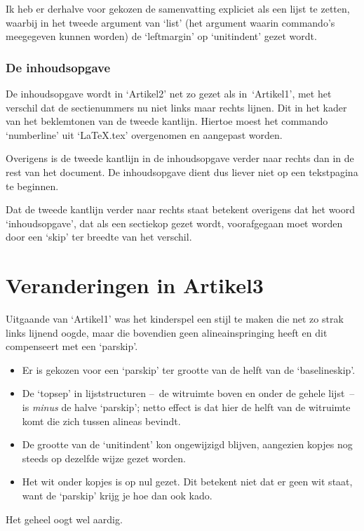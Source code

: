 \documentclass[a4paper]{artikel1} %
\begin{document}
Ik heb er derhalve voor gekozen de samenvatting expliciet als een
lijst te zetten, waarbij in het tweede argument van `list' (het
argument waarin commando's meegegeven kunnen worden) de `leftmargin'
op `unitindent' gezet wordt.
 
\section{De inhoudsopgave}
 
De inhoudsopgave wordt in `Artikel2' net zo gezet als in~`Artikel1',
met het verschil dat de sectienummers nu niet links maar rechts
lijnen. Dit in het kader van het beklemtonen van de tweede kantlijn.
Hiertoe moest het commando `numberline' uit `LaTeX.tex' overgenomen en
aangepast worden.
 
Overigens is de tweede kantlijn in de inhoudsopgave verder naar rechts
dan in de rest van het document. De inhoudsopgave dient dus liever
niet op een tekstpagina te beginnen.
 
Dat de tweede kantlijn verder naar rechts staat betekent overigens dat
het woord `inhoudsopgave', dat als een sectiekop gezet wordt,
voorafgegaan moet worden door een `skip' ter breedte van het verschil.
 
 
 
\part{Veranderingen in Artikel3}
 
Uitgaande van `Artikel1' was het kinderspel een stijl te maken die net
zo strak links lijnend oogde, maar die bovendien geen
alinea\-inspringing heeft en dit compenseert met een `parskip'.
\begin{itemize}
\item Er is gekozen voor een `parskip' ter grootte van de helft van de
  `baselineskip'.
\item De `topsep' in lijststructuren --~de witruimte boven en onder de
  gehele lijst~-- is \emph{minus} de halve `parskip'; netto effect is
  dat hier de helft van de witruimte komt die zich tussen alineas
  bevindt.
\item De grootte van de `unitindent' kon ongewijzigd blijven,
  aangezien kopjes nog steeds op dezelfde wijze gezet worden.
\item Het wit onder kopjes is op nul gezet. Dit betekent niet dat er
  geen wit staat, want de `parskip' krijg je hoe dan ook kado.
\end{itemize}
Het geheel oogt wel aardig.
 
\end{document}
